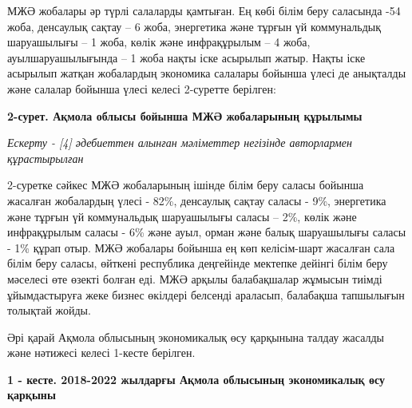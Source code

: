 МЖӘ жобалары әр түрлі салаларды қамтыған. Ең көбі білім беру саласында
-54 жоба, денсаулық сақтау -- 6 жоба, энергетика және тұрғын үй
коммунальдық шаруашылығы -- 1 жоба, көлік және инфрақұрылым -- 4 жоба,
ауылшаруашылығында -- 1 жоба нақты іске асырылып жатыр. Нақты іске
асырылып жатқан жобалардың экономика салалары бойынша үлесі де анықталды
және салалар бойынша үлесі келесі 2-суретте берілген:

{\bfseries 2-сурет. Ақмола облысы бойынша МЖӘ жобаларының құрылымы}

\emph{Ескерту - {[}4{]} әдебиеттен алынған мәліметтер негізінде
авторлармен құрастырылған}

2-суретке сәйкес МЖӘ жобаларының ішінде білім беру саласы бойынша
жасалған жобалардың үлесі - 82\%, денсаулық сақтау саласы - 9\%,
энергетика және тұрғын үй коммунальдық шаруашылығы саласы -- 2\%, көлік
және инфрақұрылым саласы - 6\% және ауыл, орман және балық шаруашылығы
саласы - 1\% құрап отыр. МЖӘ жобалары бойынша ең көп келісім-шарт
жасалған сала білім беру саласы, өйткені республика деңгейінде мектепке
дейінгі білім беру мәселесі өте өзекті болған еді. МЖӘ арқылы
балабақшалар жұмысын тиімді ұйымдастыруға жеке бизнес өкілдері белсенді
араласып, балабақша тапшылығын толықтай жойды.

Әрі қарай Ақмола облысының экономикалық өсу қарқынына талдау жасалды
және нәтижесі келесі 1-кесте берілген.

{\bfseries 1 - кесте. 2018-2022 жылдарғы Ақмола облысының экономикалық өсу
қарқыны}

